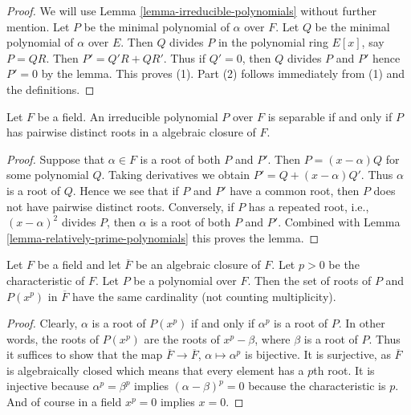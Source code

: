 \begin{proof}
We will use Lemma \ref{lemma-irreducible-polynomials} without further mention.
Let $P$ be the minimal polynomial of $\alpha$ over $F$.
Let $Q$ be the minimal polynomial of $\alpha$ over $E$.
Then $Q$ divides $P$ in the polynomial ring $E[x]$, say $P = QR$.
Then $P' = Q'R + QR'$. Thus if $Q' = 0$, then $Q$ divides $P$ and $P'$
hence $P' = 0$ by the lemma. This proves (1). Part (2)
follows immediately from (1) and the definitions.
\end{proof}

\begin{lemma}
\label{lemma-recognize-separable}
Let $F$ be a field. An irreducible polynomial $P$ over $F$
is separable if and only if $P$ has pairwise distinct roots in a
algebraic closure of $F$.
\end{lemma}

\begin{proof}
Suppose that $\alpha \in F$ is a root of both $P$ and $P'$.
Then $P = (x - \alpha)Q$ for some polynomial $Q$. Taking derivatives
we obtain $P' = Q + (x - \alpha)Q'$. Thus $\alpha$ is a root of $Q$.
Hence we see that if $P$ and $P'$ have a common root, then $P$
does not have pairwise distinct roots. Conversely, if $P$ has
a repeated root, i.e., $(x - \alpha)^2$ divides $P$, then $\alpha$
is a root of both $P$ and $P'$. Combined with
Lemma \ref{lemma-relatively-prime-polynomials} this proves the lemma.
\end{proof}

\begin{lemma}
\label{lemma-nr-roots-unchanged}
Let $F$ be a field and let $\overline{F}$ be an algebraic closure of $F$.
Let $p > 0$ be the characteristic of $F$. Let $P$ be a polynomial
over $F$. Then the set of roots of $P$ and $P(x^p)$ in $\overline{F}$
have the same cardinality (not counting multiplicity).
\end{lemma}

\begin{proof}
Clearly, $\alpha$ is a root of $P(x^p)$ if and only if $\alpha^p$ is a
root of $P$. In other words, the roots of $P(x^p)$ are the roots of
$x^p - \beta$, where $\beta$ is a root of $P$. Thus it suffices to show
that the map $\overline{F} \to \overline{F}$, $\alpha \mapsto \alpha^p$
is bijective. It is surjective, as $\overline{F}$ is algebraically closed
which means that every element has a $p$th root. It is injective because
$\alpha^p = \beta^p$ implies $(\alpha - \beta)^p = 0$ because
the characteristic is $p$. And of course in a field $x^p = 0$ implies
$x = 0$.
\end{proof}


